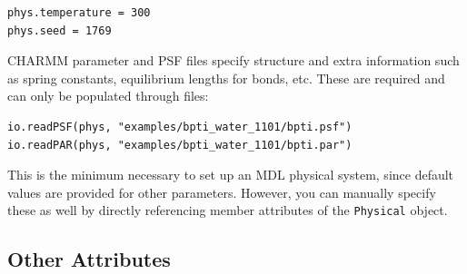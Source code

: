\documentclass[11pt]{report}
\begin{document}
\begin{verbatim}
phys.temperature = 300 
phys.seed = 1769
\end{verbatim}

CHARMM parameter and PSF files specify structure and
extra information such as spring constants, equilibrium
lengths for bonds, etc.  These are required and can only be
populated through files:

\begin{verbatim}
io.readPSF(phys, "examples/bpti_water_1101/bpti.psf")
io.readPAR(phys, "examples/bpti_water_1101/bpti.par")
\end{verbatim}

This is the minimum necessary to set up an MDL physical
system, since default values are provided for other parameters.
However, you can manually specify these as well by directly
referencing member attributes of the \texttt{Physical} object.

\subsection{Other Attributes}
\end{document}
